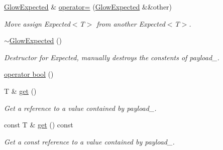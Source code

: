 \begin{DoxyCompactItemize}
\item 
\mbox{\label{classglow_1_1detail_1_1_glow_expected_a9374b8773360544e44b195d79ff4be3d}} 
\hyperlink{classglow_1_1detail_1_1_glow_expected}{Glow\+Expected} \& \hyperlink{classglow_1_1detail_1_1_glow_expected_a9374b8773360544e44b195d79ff4be3d}{operator=} (\hyperlink{classglow_1_1detail_1_1_glow_expected}{Glow\+Expected} \&\&other)
\begin{DoxyCompactList}\small\item\em Move assign Expected$<$\+T$>$ from another Expected$<$\+T$>$. \end{DoxyCompactList}\item 
\mbox{\label{classglow_1_1detail_1_1_glow_expected_a958e10595954eb2488e0adc018eb5ecc}} 
\hyperlink{classglow_1_1detail_1_1_glow_expected_a958e10595954eb2488e0adc018eb5ecc}{$\sim$\+Glow\+Expected} ()
\begin{DoxyCompactList}\small\item\em Destructor for Expected, manually destroys the constents of payload\+\_\+. \end{DoxyCompactList}\item 
\hyperlink{classglow_1_1detail_1_1_glow_expected_a5f11ce0f16940007250f5e3c516903a1}{operator bool} ()
\item 
\mbox{\label{classglow_1_1detail_1_1_glow_expected_abfeffb8f8a2235149b4af9470da05234}} 
T \& \hyperlink{classglow_1_1detail_1_1_glow_expected_abfeffb8f8a2235149b4af9470da05234}{get} ()
\begin{DoxyCompactList}\small\item\em Get a reference to a value contained by payload\+\_\+. \end{DoxyCompactList}\item 
\mbox{\label{classglow_1_1detail_1_1_glow_expected_a1bab1d511acf2fe90dfd67647f945393}} 
const T \& \hyperlink{classglow_1_1detail_1_1_glow_expected_a1bab1d511acf2fe90dfd67647f945393}{get} () const
\begin{DoxyCompactList}\small\item\em Get a const reference to a value contained by payload\+\_\+. \end{DoxyCompactList}\item 

\end{DoxyCompactItemize}
